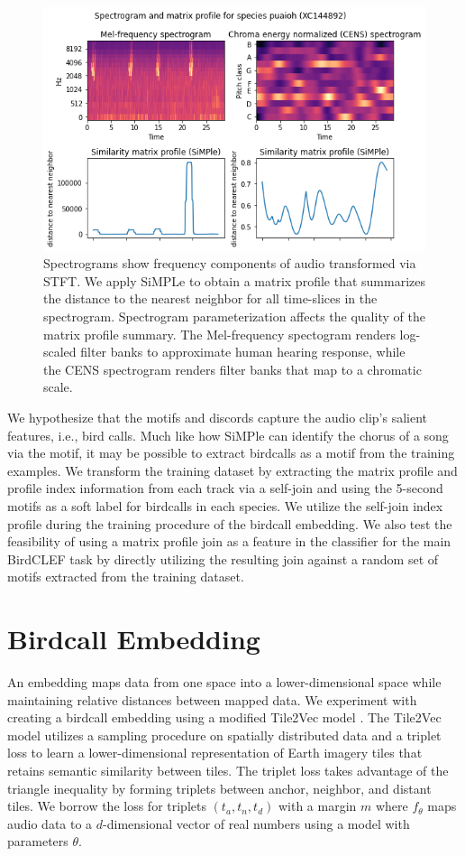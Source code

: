 \documentclass[
]{ceurart}
\begin{document}
\begin{figure}[h]
\includegraphics[width=\textwidth]{figures/XC144892-spectrogram-mp.png}
\caption{
    Spectrograms show frequency components of audio transformed via STFT. We apply SiMPLe to obtain a matrix profile that summarizes the distance to the nearest neighbor for all time-slices in the spectrogram. Spectrogram parameterization affects the quality of the matrix profile summary. The Mel-frequency spectogram renders log-scaled filter banks to approximate human hearing response, while the CENS spectrogram renders filter banks that map to a chromatic scale.
}
\label{fig:spectrogram}
\end{figure}

We hypothesize that the motifs and discords capture the audio clip's salient features, i.e., bird calls. Much like how SiMPle can identify the chorus of a song via the motif, it may be possible to extract birdcalls as a motif from the training examples. We transform the training dataset by extracting the matrix profile and profile index information from each track via a self-join and using the 5-second motifs as a soft label for birdcalls in each species. We utilize the self-join index profile during the training procedure of the birdcall embedding. We also test the feasibility of using a matrix profile join as a feature in the classifier for the main BirdCLEF task by directly utilizing the resulting join against a random set of motifs extracted from the training dataset.

\section{Birdcall Embedding}

An embedding maps data from one space into a lower-dimensional space while maintaining relative distances between mapped data. We experiment with creating a birdcall embedding using a modified Tile2Vec model \cite{jean2019tile2vec}. The Tile2Vec model utilizes a sampling procedure on spatially distributed data and a triplet loss to learn a lower-dimensional representation of Earth imagery tiles that retains semantic similarity between tiles. The triplet loss takes advantage of the triangle inequality by forming triplets between anchor, neighbor, and distant tiles. We borrow the loss for triplets $(t_a, t_n, t_d)$ with a margin $m$ where $f_{\theta}$ maps audio data to a $d$-dimensional vector of real numbers using a model with parameters $\theta$.
\end{document}
